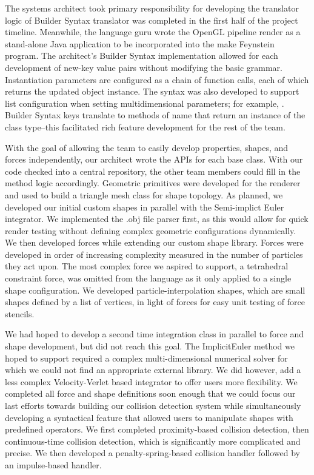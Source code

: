 The systems architect took primary responsibility for developing the
translator logic of Builder Syntax translator was completed in the
first half of the project timeline. Meanwhile, the language guru wrote
the OpenGL pipeline render as a stand-alone Java application to be
incorporated into the make Feynstein program. The architect's Builder
Syntax implementation allowed for each development of new-key value
pairs without modifying the basic grammar. Instantiation parameters
are configured as a chain of function calls, each of which returns the
updated object instance. The syntax was also developed to support list
configuration when setting multidimensional parameters; for example,
. Builder Syntax keys
translate to methods of name  that return an
instance of the class type--this facilitated rich feature development
for the rest of the team.

With the goal of allowing the team to easily develop properties,
shapes, and forces independently, our architect wrote the APIs for
each base class. With our code checked into a central repository, the
other team members could fill in the method logic
accordingly. Geometric primitives were developed for the renderer and
used to build a triangle mesh class for shape topology. As planned, we
developed our initial custom shapes in parallel with the Semi-implict
Euler integrator. We implemented the .obj file parser first, as this
would allow for quick render testing without defining complex
geometric configurations dynamically. We then developed forces while
extending our custom shape library. Forces were developed in order of
increasing complexity measured in the number of particles they act
upon. The most complex force we aspired to support, a tetrahedral
constraint force, was omitted from the language as it only applied to
a single shape configuration. We developed particle-interpolation
shapes, which are small shapes defined by a list of vertices, in light
of forces for easy unit testing of force stencils.

We had hoped to develop a second time integration class in parallel to
force and shape development, but did not reach this goal. The
ImplicitEuler method we hoped to support required a complex
multi-dimensional numerical solver for which we could not find an
appropriate external library. We did however, add a less complex
Velocity-Verlet based integrator to offer users more flexibility. We
completed all force and shape definitions soon enough that we could
focus our last efforts towards building our collision detection system
while simultaneously developing a syntactical feature that allowed
users to manipulate shapes with predefined operators. We first
completed proximity-based collision detection, then continuous-time
collision detection, which is significantly more complicated and
precise. We then developed a penalty-spring-based collision handler
followed by an impulse-based handler.

